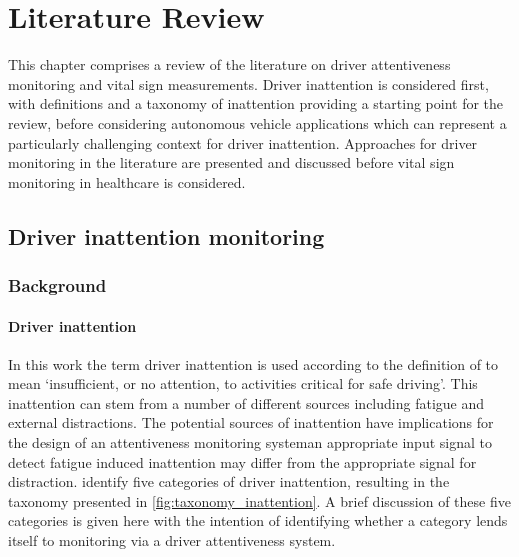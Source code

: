 \documentclass[11pt, parskip=half*,twoside=false]{scrbook}
\begin{document}


\chapter{Literature Review} \label{ch:litreview}
This chapter comprises a review of the literature on driver attentiveness monitoring and vital sign measurements. Driver inattention is considered first, with definitions and a taxonomy of inattention providing a starting point for the review, before considering autonomous vehicle applications which can represent a particularly challenging context for driver inattention. Approaches for driver monitoring in the literature are presented and discussed before vital sign monitoring in healthcare is considered.

\section{Driver inattention monitoring} \label{sec:distraction}
\subsection{Background} \label{ssec:overview}

\subsubsection{Driver inattention}
In this work the term driver inattention is used according to the definition of \citet{reganDriverDistractionDriver2011} to mean `insufficient, or no attention, to activities critical for safe driving'. This inattention can stem from a number of different sources including fatigue and external distractions. The potential sources of inattention have implications for the design of an attentiveness monitoring system\textemdash an appropriate input signal to detect fatigue induced inattention may differ from the appropriate signal for distraction.  \citet{reganDriverDistractionDriver2011} identify five categories of driver inattention, resulting in the taxonomy presented in \cref{fig:taxonomy_inattention}. A brief discussion of these five categories is given here with the intention of identifying whether a category lends itself to monitoring via a driver attentiveness system. 
\end{document}
